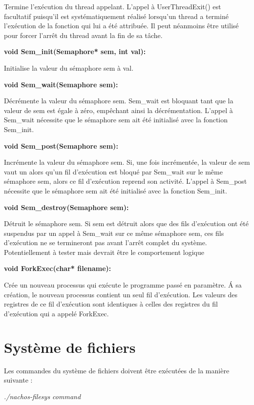 \documentclass[12pt]{report}
\begin{document}
Termine l'exécution du thread appelant. L'appel à UserThreadExit() est facultatif puisqu'il est systématiquement réalisé lorsqu'un thread a terminé l'exécution de la fonction qui lui a été attribuée. Il peut néanmoins être utilisé pour forcer l'arrêt du thread avant la fin de sa tâche.
\bigskip


\textbf{void Sem\_init(Semaphore* sem, int val):}

Initialise la valeur du sémaphore sem à val.
\bigskip	


\textbf{void Sem\_wait(Semaphore sem):}

Décrémente la valeur du sémaphore sem. Sem\_wait est bloquant tant que la valeur de sem est égale à zéro, empêchant ainsi la décrémentation.
L'appel à Sem\_wait nécessite que le sémaphore sem ait été initialisé avec la fonction Sem\_init.
\bigskip


\textbf{void Sem\_post(Semaphore sem):}

Incrémente la valeur du sémaphore sem. Si, une fois incrémentée, la valeur de sem vaut un alors qu'un fil d'exécution est bloqué par Sem\_wait sur le même sémaphore sem, alors ce fil d'exécution reprend son activité.
L'appel à Sem\_post nécessite que le sémaphore sem ait été initialisé avec la fonction Sem\_init.
\bigskip


\textbf{void Sem\_destroy(Semaphore sem):}

Détruit le sémaphore sem. Si sem est détruit alors que des fils d'exécution ont été suspendus par un appel à Sem\_wait sur ce même sémaphore sem, ces fils d'exécution ne se termineront pas avant l'arrêt complet du système.\\
\color{red}Potentiellement à tester mais devrait être le comportement logique\color{black}
\bigskip


\textbf{void ForkExec(char* filename):}

Crée un nouveau processus qui exécute le programme passé en paramètre. \'A sa création, le nouveau processus contient un seul fil d'exécution. Les valeurs des registres de ce fil d'exécution sont identiques à celles des registres du fil d'exécution qui a appelé ForkExec.
\bigskip


\section{Système de fichiers}

Les commandes du système de fichiers doivent être exécutées de la manière suivante :


\textit{./nachos-filesys command}
\end{document}
